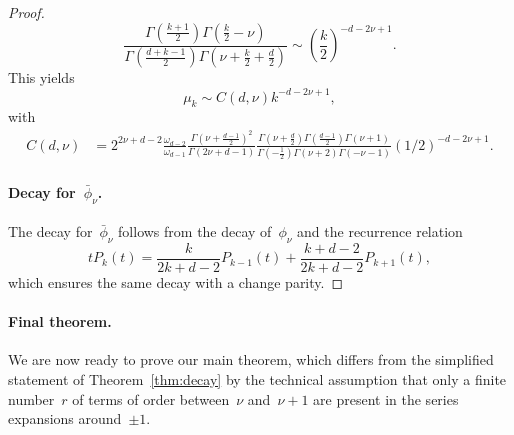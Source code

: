 \begin{proof}
\begin{equation}
\frac{\Gamma(\frac{k + 1}{2}) \Gamma(\frac{k}{2} - \nu) }{\Gamma(\frac{d+k-1}{2}) \Gamma(\nu + \frac{k}{2} + \frac{d}{2})} \sim \left(\frac{k}{2} \right)^{-d-2 \nu + 1}.
\end{equation}
This yields
\begin{equation}
\mu_k \sim C(d,\nu) k^{-d-2 \nu + 1},
\end{equation}
with
\begin{align}
C(d,\nu) &= 2^{2 \nu + d - 2} \frac{\omega_{d-2}}{\omega_{d-1}} \frac{\Gamma(\nu + \frac{d-1}{2})^2}{\Gamma(2 \nu + d - 1)} \frac{\Gamma(\nu + \frac{d}{2}) \Gamma(\frac{d-1}{2}) \Gamma(\nu + 1)}{\Gamma(-\frac{1}{2}) \Gamma(\nu + 2) \Gamma(-\nu - 1)} (1/2)^{-d-2 \nu + 1}.
\end{align}

\paragraph{Decay for~$\bar \phi_\nu$.}
The decay for~$\bar \phi_\nu$ follows from the decay of~$\phi_\nu$ and the recurrence relation~\citep[][Eq.~(4.36)]{costas2014spherical}
\begin{equation}
t P_k(t) = \frac{k}{2k + d - 2}P_{k-1}(t) + \frac{k+d - 2}{2k + d - 2} P_{k+1}(t),
\end{equation}
which ensures the same decay with a change parity.
\end{proof}



\paragraph{Final theorem.}
We are now ready to prove our main theorem, which differs from the simplified statement of Theorem~\ref{thm:decay} by the technical assumption that only a finite number~$r$ of terms of order between~$\nu$ and~$\nu + 1$ are present in the series expansions around~$\pm 1$.

